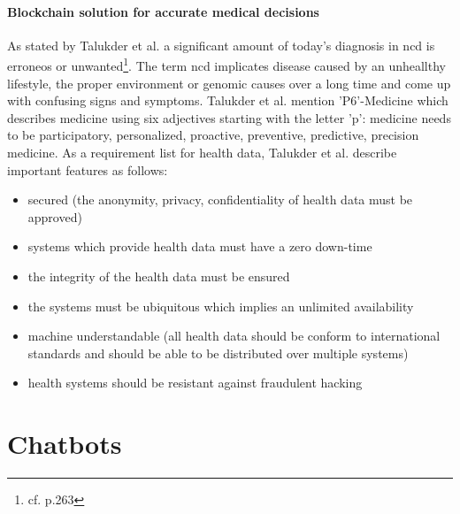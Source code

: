 \paragraph{Blockchain solution for accurate medical decisions}
As stated by Talukder et al. a significant amount of today's diagnosis in \ac{ncd} is erroneos or unwanted\footnote{cf.\autocite{talukder} p.263}. The term \ac{ncd} implicates disease caused by an unheallthy lifestyle, the proper environment or genomic causes over a long time and come up with confusing signs and symptoms.
Talukder et al. mention 'P6'-Medicine which describes medicine using six adjectives starting with the letter 'p': medicine needs to be participatory, personalized, proactive, preventive, predictive, precision medicine.
As a requirement list for health data, Talukder et al. describe important features as follows: 

\begin{itemize}
\setlength\itemsep{-0.5em}
  \item secured (the anonymity, privacy, confidentiality of health data must be approved)
  \item systems which provide health data must have a zero down-time 
  \item the integrity of the health data must be ensured
  \item the systems must be ubiquitous which implies an unlimited availability
  \item machine understandable (all health data should be conform to international standards and should be able to be distributed over multiple systems)
  \item health systems should be resistant against fraudulent hacking
\end{itemize}

\section{Chatbots} 

